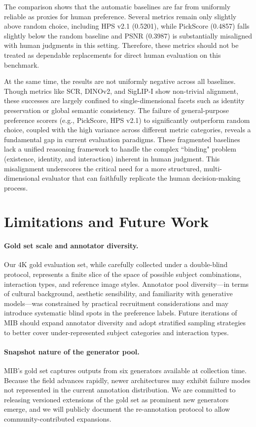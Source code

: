 \documentclass{article}
\begin{document}
The comparison shows that the automatic baselines are far from uniformly reliable as proxies for human preference. Several metrics remain only slightly above random choice, including HPS v2.1 (0.5201), while PickScore (0.4857) falls slightly below the random baseline and PSNR (0.3987) is substantially misaligned with human judgments in this setting. Therefore, these metrics should not be treated as dependable replacements for direct human evaluation on this benchmark.

At the same time, the results are not uniformly negative across all baselines. Though metrics like SCR, DINOv2, and SigLIP-I show non-trivial alignment, these successes are largely confined to single-dimensional facets such as identity preservation or global semantic consistency. The failure of general-purpose preference scorers (e.g., PickScore, HPS v2.1) to significantly outperform random choice, coupled with the high variance across different metric categories, reveals a fundamental gap in current evaluation paradigms. These fragmented baselines lack a unified reasoning framework to handle the complex ``binding" problem (existence, identity, and interaction) inherent in human judgment. This misalignment underscores the critical need for a more structured, multi-dimensional evaluator that can faithfully replicate the human decision-making process.

\section{Limitations and Future Work}

\paragraph{Gold set scale and annotator diversity.}
Our 4K gold evaluation set, while carefully collected under a double-blind protocol, represents a finite slice of the space of possible subject combinations, interaction types, and reference image styles.  
Annotator pool diversity—in terms of cultural background, aesthetic sensibility, and familiarity with generative models—was constrained by practical recruitment considerations and may introduce systematic blind spots in the preference labels.  
Future iterations of MIB should expand annotator diversity and adopt stratified sampling strategies to better cover under-represented subject categories and interaction types.

\paragraph{Snapshot nature of the generator pool.}
MIB's gold set captures outputs from six generators available at collection time.  
Because the field advances rapidly, newer architectures may exhibit failure modes not represented in the current annotation distribution.
We are committed to releasing versioned extensions of the gold set as prominent new generators emerge, and we will publicly document the re-annotation protocol to allow community-contributed expansions.
\end{document}
